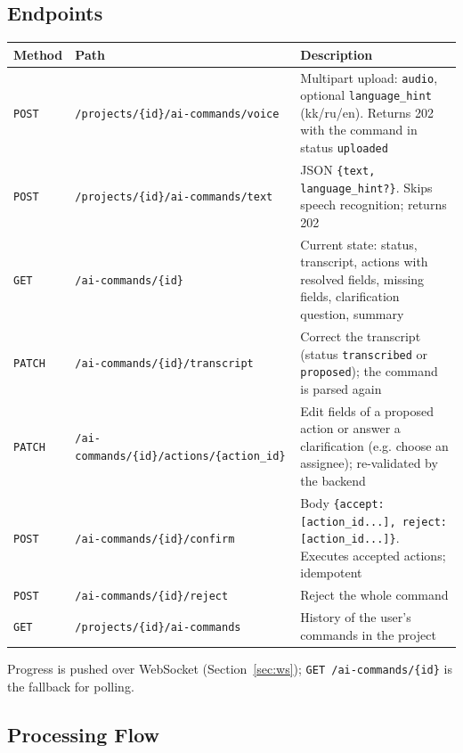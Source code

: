 \documentclass[11pt,a4paper]{article}
\newcommand{\tblstart}{\small\rowcolors{2}{gray!7}{white}}
\newcommand{\code}[1]{\texttt{#1}}
\newcommand{\GET}{\textcolor{green!45!black}{\texttt{GET}}}
\newcommand{\POST}{\textcolor{blue!60!black}{\texttt{POST}}}
\newcommand{\PATCH}{\textcolor{orange!80!black}{\texttt{PATCH}}}
\begin{document}
\subsection{Endpoints}
{\tblstart
\begin{xltabular}{\textwidth}{P{1.3cm} P{7.2cm} L}
\toprule
\textbf{Method} & \textbf{Path} & \textbf{Description} \\
\midrule
\endhead
\POST & \code{/projects/\{id\}/ai-commands/voice} & Multipart upload: \code{audio}, optional \code{language\_hint} (kk/ru/en). Returns 202 with the command in status \code{uploaded} \\
\POST & \code{/projects/\{id\}/ai-commands/text} & JSON \code{\{text, language\_hint?\}}. Skips speech recognition; returns 202 \\
\GET & \code{/ai-commands/\{id\}} & Current state: status, transcript, actions with resolved fields, missing fields, clarification question, summary \\
\PATCH & \code{/ai-commands/\{id\}/transcript} & Correct the transcript (status \code{transcribed} or \code{proposed}); the command is parsed again \\
\PATCH & \code{/ai-commands/\{id\}/actions/\{action\_id\}} & Edit fields of a proposed action or answer a clarification (e.g. choose an assignee); re-validated by the backend \\
\POST & \code{/ai-commands/\{id\}/confirm} & Body \code{\{accept: [action\_id...], reject: [action\_id...]\}}. Executes accepted actions; idempotent \\
\POST & \code{/ai-commands/\{id\}/reject} & Reject the whole command \\
\GET & \code{/projects/\{id\}/ai-commands} & History of the user's commands in the project \\
\bottomrule
\end{xltabular}}

Progress is pushed over WebSocket (Section~\ref{sec:ws}); \code{GET /ai-commands/\{id\}} is the fallback for polling.

\subsection{Processing Flow}
\end{document}
